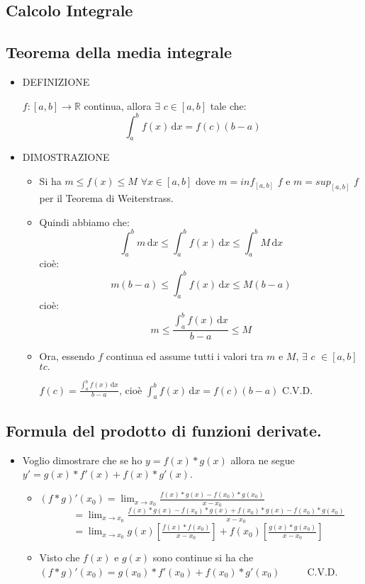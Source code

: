 \documentclass[10pt]{article}
\begin{document}
\begin{itemize}
\begin{itemize}
\section{Calcolo Integrale}
\subsection{Teorema della media integrale}
\begin{itemize}
\item
DEFINIZIONE
\begin{itemize}
$f: [a, b] \rightarrow \mathbb{R}$ continua, allora $\exists$ $c \in [a,b]$ tale che: $$\int_a^b \! f(x) \, \mathrm{d}x = f(c)(b-a)$$
\end{itemize} \medskip
\item
DIMOSTRAZIONE
\begin{itemize}
\item
Si ha $m \leq f(x) \leq M$ $\forall x \in [a,b]$ dove $m = inf_{[a,b]}$ $f$ e $m = sup_{[a,b]}$ $f$ per il Teorema di Weiterstrass.\medskip
\item 
Quindi abbiamo che:
$$\int_a^b \! m \, \mathrm{d}x \leq \int_a^b \! f(x) \, \mathrm{d}x \leq \int_a^b \! M \, \mathrm{d}x $$ \qquad cioè:
$$ m (b-a) \leq \int_a^b \! f(x) \, \mathrm{d}x \leq M (b-a) $$ \qquad cioè:
$$ m \leq \displaystyle{\frac{\int_a^b \! f(x) \, \mathrm{d}x}{b-a}} \leq M $$ \smallskip
\item
Ora, essendo $f$ continua ed assume tutti i valori tra $m$ e $M$, $\exists$ $c$ $\in [a,b]$ $tc.$ \medskip

$f(c) = \displaystyle{ \frac{\int_a^b \! f(x) \, \mathrm{d}x}{b-a}}$, cioè $\displaystyle{\int_a^b \! f(x) \, \mathrm{d}x = f(c)(b-a)}$ \qquad C.V.D.
\end{itemize}
\end{itemize} \medskip \medskip
\subsection{Formula del prodotto di funzioni derivate.}
\begin{itemize}
\item
Voglio dimostrare che se ho $y = f(x) * g(x)$ allora ne segue $y'= g(x)*f'(x) + f(x)*g'(x)$.\medskip
\begin{itemize}
\item
$(f*g)'(x_0) = \displaystyle{\lim_{x \to x_0}{\frac{f(x)*g(x) - f(x_0)*g(x_0)}{x-x_0}}}$\medskip
\subitem
$\; \; \; \; \; \; \; \; \; \; \; \;= \displaystyle{\lim_{x \to x_0}{\frac{f(x)*g(x) - f(x_0)*g(x) + f(x_0)*g(x) - f(x_0)*g(x_0)}{x-x_0}}}$\medskip
\subitem
$\; \; \; \; \; \; \; \; \; \; \; \;= \displaystyle{\lim_{x \to x_0}{g(x) \left[\frac{f(x)*f(x_0)}{x-x_0}\right] + f(x_0) \left[\frac{g(x)*g(x_0)}{x-x_0}\right]}}$ \medskip \smallskip
\item
Visto che $f(x)$ e $g(x)$ sono continue si ha che $(f*g)'(x_0) = \displaystyle{g(x_0)*f'(x_0) + f(x_0)*g'(x_0)\hspace{1cm}}$ C.V.D.
\end{itemize}
\end{itemize} 
\bigskip \bigskip \bigskip \bigskip \bigskip \bigskip \bigskip \bigskip \bigskip \bigskip   

\end{itemize}
\end{itemize}
\end{document}
